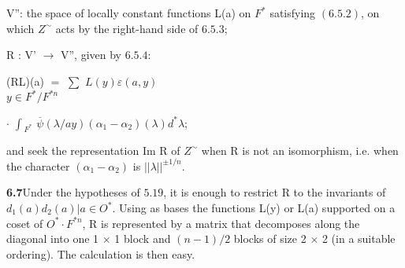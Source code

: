 \documentclass[10pt,a4paper]{article}
\begin{document}
\par V'': the space of locally constant functions L(a) on $F^*$ satisfying $(6.5.2)$, on which $Z^\sim$ acts by the right-hand side of $6.5.3$;\par
\par R : V' $\to{}$ V'', given by $6.5.4$:\par
\par\smallskip\begin{center}\begin{minipage}{0.96\textwidth}\centering
(RL)(a) $=$ $\sum{}$ $L(y)\varepsilon{}(a,y)$ \\ $y\in{}F^*/F^{*n}$
\end{minipage}\end{center}\smallskip
\par\smallskip\begin{center}\begin{minipage}{0.96\textwidth}\centering
$\cdot{}$ $\int{}_{F^*}$ $\overline{\psi{}}(\lambda{}/ay)(\alpha{}_1-\alpha{}_2)(\lambda{})d^*\lambda{}$;
\end{minipage}\end{center}\smallskip
\par and seek the representation Im R of $Z^\sim$ when R is not an isomorphism, i.e. when the character $(\alpha{}_1-\alpha{}_2)$ is $||\lambda{}||^{\pm{}1/n}$.\par
\par\noindent\textbf{6.7}\quad Under the hypotheses of $5.19$, it is enough to restrict R to the invariants of ${d_1(a)d_2(a)|a\in{}O^*}$. Using as bases the functions L(y) or L(a) supported on a coset of $O^*\cdot{}F^{*n}$, R is represented by a matrix that decomposes along the diagonal into one 1 $\times{}$ 1 block and $(n-1)/2$ blocks of size 2 $\times{}$ 2 (in a suitable ordering). The calculation is then easy.\par
\end{document}
